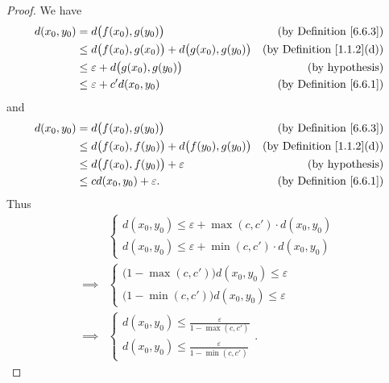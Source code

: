 \begin{proof}
    We have
    \begin{align*}
        d(x_0, y_0) & = d\big(f(x_0), g(y_0)\big)                                & \text{(by Definition \ref{6.6.3})}    \\
                    & \leq d\big(f(x_0), g(x_0)\big) + d\big(g(x_0), g(y_0)\big) & \text{(by Definition \ref{1.1.2}(d))} \\
                    & \leq \varepsilon + d\big(g(x_0), g(y_0)\big)               & \text{(by hypothesis)}                \\
                    & \leq \varepsilon + c' d(x_0, y_0)                          & \text{(by Definition \ref{6.6.1})}
    \end{align*}
    and
    \begin{align*}
        d(x_0, y_0) & = d\big(f(x_0), g(y_0)\big)                                & \text{(by Definition \ref{6.6.3})}    \\
                    & \leq d\big(f(x_0), f(y_0)\big) + d\big(f(y_0), g(y_0)\big) & \text{(by Definition \ref{1.1.2}(d))} \\
                    & \leq d\big(f(x_0), f(y_0)\big) + \varepsilon               & \text{(by hypothesis)}                \\
                    & \leq c d(x_0, y_0) + \varepsilon.                          & \text{(by Definition \ref{6.6.1})}
    \end{align*}
    Thus
    \begin{align*}
                 & \begin{cases}
                       d(x_0, y_0) \leq \varepsilon + \max(c, c') \cdot d(x_0, y_0) \\
                       d(x_0, y_0) \leq \varepsilon + \min(c, c') \cdot d(x_0, y_0)
                   \end{cases} \\
        \implies & \begin{cases}
                       \big(1 - \max(c, c')\big) d(x_0, y_0) \leq \varepsilon \\
                       \big(1 - \min(c, c')\big) d(x_0, y_0) \leq \varepsilon
                   \end{cases}       \\
        \implies & \begin{cases}
                       d(x_0, y_0) \leq \frac{\varepsilon}{1 - \max(c, c')} \\
                       d(x_0, y_0) \leq \frac{\varepsilon}{1 - \min(c, c')}
                   \end{cases}.
    \end{align*}
\end{proof}